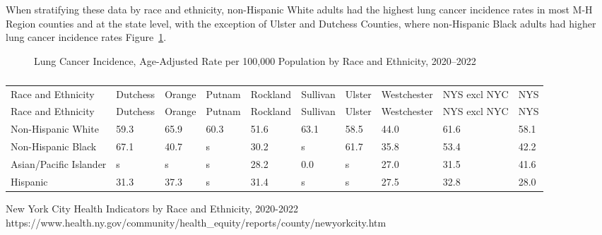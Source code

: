 \documentclass[
  english,
  letterpaper,
]{report}
\begin{document}
When stratifying these data by race and ethnicity, non-Hispanic White
adults had the highest lung cancer incidence rates in most M-H Region
counties and at the state level, with the exception of Ulster and
Dutchess Counties, where non-Hispanic Black adults had higher lung
cancer incidence rates Figure~\ref{fig-lungca-incidence-rande-aar}.

\begin{figure}


\caption{\label{fig-lungca-incidence-rande-aar}Lung Cancer Incidence,
Age-Adjusted Rate per 100,000 Population by Race and Ethnicity,
2020--2022}

\end{figure}%

\begin{longtable}[]{@{}llllllllll@{}}

\caption{\label{tbl-lungca-incidence-rande-aar}Lung Cancer Incidence,
Age-Adjusted Rate per 100,000 Population by Race and Ethnicity,
2020--2022}

\tabularnewline

\caption{}\label{T_6dd5b}\tabularnewline
\toprule\noalign{}
Race and Ethnicity & Dutchess & Orange & Putnam & Rockland & Sullivan &
Ulster & Westchester & NYS excl NYC & NYS \\
\midrule\noalign{}
\endfirsthead
\toprule\noalign{}
Race and Ethnicity & Dutchess & Orange & Putnam & Rockland & Sullivan &
Ulster & Westchester & NYS excl NYC & NYS \\
\midrule\noalign{}
\endhead
\bottomrule\noalign{}
\endlastfoot
Non-Hispanic White & 59.3 & 65.9 & 60.3 & 51.6 & 63.1 & 58.5 & 44.0 &
61.6 & 58.1 \\
Non-Hispanic Black & 67.1 & 40.7 & s & 30.2 & s & 61.7 & 35.8 & 53.4 &
42.2 \\
Asian/Pacific Islander & s & s & s & 28.2 & 0.0 & s & 27.0 & 31.5 &
41.6 \\
Hispanic & 31.3 & 37.3 & s & 31.4 & s & s & 27.5 & 32.8 & 28.0 \\

\end{longtable}

\begin{tcolorbox}[enhanced jigsaw, breakable, leftrule=.75mm, title=\textcolor{quarto-callout-note-color}{\faInfo}\hspace{0.5em}{Source}, bottomrule=.15mm, opacityback=0, left=2mm, colback=white, bottomtitle=1mm, coltitle=black, colbacktitle=quarto-callout-note-color!10!white, colframe=quarto-callout-note-color-frame, opacitybacktitle=0.6, toptitle=1mm, titlerule=0mm, arc=.35mm, rightrule=.15mm, toprule=.15mm]

New York City Health Indicators by Race and Ethnicity, 2020-2022
https://www.health.ny.gov/community/health\_equity/reports/county/newyorkcity.htm

\end{tcolorbox}
\end{document}
